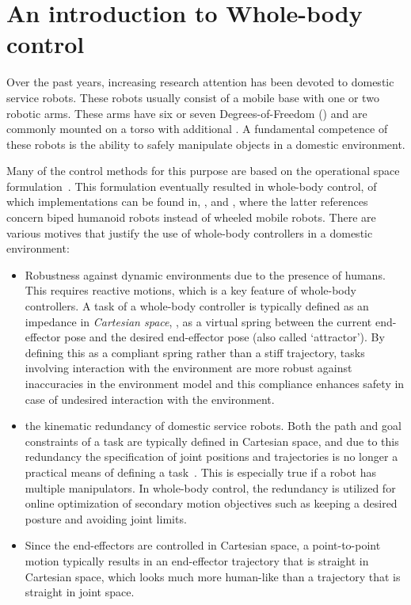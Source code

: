\section{An introduction to Whole-body control}\label{wbp:sec:intro}
Over the past years, increasing research attention has been devoted to domestic service robots. These robots usually consist of a mobile base with one or two robotic arms. These arms have six or seven Degrees-of-Freedom (\dofs) and are commonly mounted on a torso with additional \dofs. A fundamental competence of these robots is the ability to safely manipulate objects in a domestic environment.

Many of the control methods for this purpose are based on the operational space formulation~\citep{Khatib1987}. This formulation eventually resulted in whole-body control, of which implementations can be found in, \eg, \citet{Nagasaka2010,Dietrich2012} and \citet{Gienger2005,Sentis2005}, where the latter references concern biped humanoid robots instead of wheeled mobile robots.
There are various motives that justify the use of whole-body controllers in a domestic environment:
\begin{itemize}
    \item Robustness against dynamic environments due to the presence of humans. This requires reactive motions, which is a key feature of whole-body controllers. 
    A task of a whole-body controller is typically defined as an impedance in \emph{Cartesian space}, \ie, as a virtual spring between the current end-effector pose and the desired end-effector pose (also called `attractor'). By defining this as a compliant spring rather than a stiff trajectory, tasks involving interaction with the environment are more robust against inaccuracies in the environment model and this compliance enhances safety in case of undesired interaction with the environment.
    \item the kinematic redundancy of domestic service robots. Both the path and goal constraints of a task are typically defined in Cartesian space, and due to this redundancy the specification of joint positions and trajectories is no longer a practical means of defining a task~\citep{Brock2002a}. This is especially true if a robot has multiple manipulators. In whole-body control, the redundancy is utilized for online optimization of secondary motion objectives such as keeping a desired posture and avoiding joint limits.
	\item Since the end-effectors are controlled in Cartesian space, a point-to-point motion typically results in an end-effector trajectory that is straight in Cartesian space, which looks much more human-like than a trajectory that is straight in joint space.
\end{itemize}

